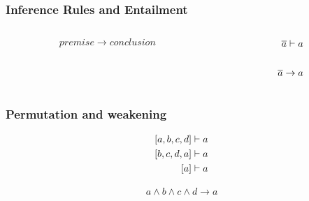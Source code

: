 \documentclass[leqno]{beamer}
\begin{document}

\begin{frame}
\frametitle{Inference Rules and Entailment}

\begin{columns}[t]
\begin{column}{0.5\linewidth}
\begin{prooftree}
\end{prooftree}

\[ premise \rightarrow conclusion \]
\end{column}
\begin{column}{0.5\linewidth}
\begin{align*}
  \entails{\ovl{a}}{a}\\~\\
  \ovl{a} \rightarrow a
\end{align*}
\end{column}
\end{columns}
\end{frame}

\begin{frame}
\frametitle{Permutation and weakening}
\begin{align*}
\entails{[a,b,c,d]}{a}\\
\entails{[b,c,d,a]}{a}\\
\entails{[a]}{a}
\end{align*}

\begin{align*}
a \land b \land c \land d \rightarrow a
\end{align*}
\end{frame}
\end{document}
